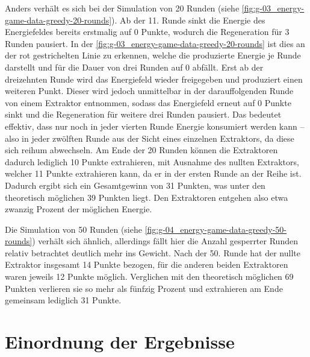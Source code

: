 


\pagebreak

Anders verhält es sich bei der Simulation von 20 Runden (siehe \autoref{fig:g-03_energy-game-data-greedy-20-rounds}). Ab der 11. Runde sinkt die Energie des Energiefeldes bereits erstmalig auf 0 Punkte, wodurch die Regeneration für 3 Runden pausiert. In der \autoref{fig:g-03_energy-game-data-greedy-20-rounds} ist dies an der rot gestrichelten Linie zu erkennen, welche die produzierte Energie je Runde darstellt und für die Dauer von drei Runden auf 0 abfällt. Erst ab der dreizehnten Runde wird das Energiefeld wieder freigegeben und produziert einen weiteren Punkt. Dieser wird jedoch unmittelbar in der darauffolgenden Runde von einem Extraktor entnommen, sodass das Energiefeld erneut auf 0 Punkte sinkt und die Regeneration für weitere drei Runden pausiert. Das bedeutet effektiv, dass nur noch in jeder vierten Runde Energie konsumiert werden kann -- also in jeder zwölften Runde aus der Sicht eines einzelnen Extraktors, da diese sich reihum abwechseln. Am Ende der 20 Runden können die Extraktoren dadurch lediglich 10 Punkte extrahieren, mit Ausnahme des nullten Extraktors, welcher 11 Punkte extrahieren kann, da er in der ersten Runde an der Reihe ist. Dadurch ergibt sich ein Gesamtgewinn von 31 Punkten, was unter den theoretisch möglichen 39 Punkten liegt. Den Extraktoren entgehen also etwa zwanzig Prozent der möglichen Energie.

Die Simulation von 50 Runden (siehe \autoref{fig:g-04_energy-game-data-greedy-50-rounds}) verhält sich ähnlich, allerdings fällt hier die Anzahl gesperrter Runden relativ betrachtet deutlich mehr ins Gewicht. Nach der 50. Runde hat der nullte Extraktor insgesamt 14 Punkte bezogen, für die anderen beiden Extraktoren waren jeweils 12 Punkte möglich. Verglichen mit den theoretisch möglichen 69 Punkten verlieren sie so mehr als fünfzig Prozent und extrahieren am Ende gemeinsam lediglich 31 Punkte.

\section{Einordnung der Ergebnisse}
\label{sec:02-02-03_interpretation-of-results}

